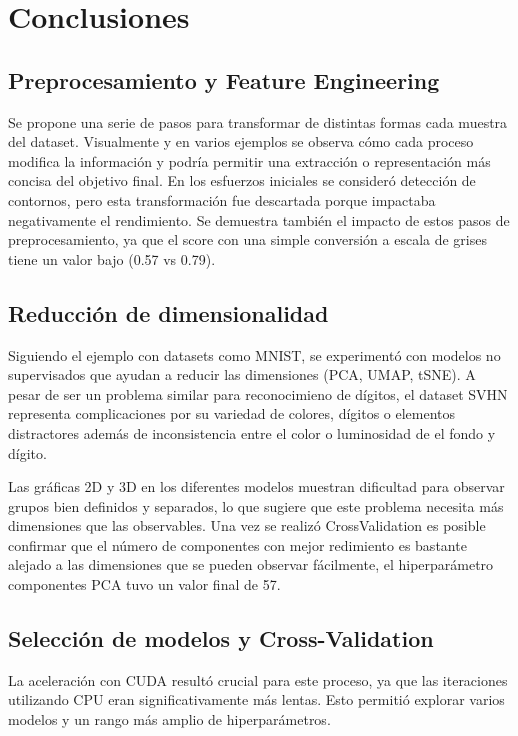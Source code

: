 \documentclass[journal]{IEEEtran}
\begin{document}
\section{Conclusiones}

\subsection{Preprocesamiento y Feature Engineering}
Se propone una serie de pasos para transformar de distintas formas cada muestra del dataset. Visualmente y en varios ejemplos se observa cómo cada proceso modifica la información y podría permitir una extracción o representación más concisa del objetivo final. En los esfuerzos iniciales se consideró detección de contornos, pero esta transformación fue descartada porque impactaba negativamente el rendimiento. Se demuestra también el impacto de estos pasos de preprocesamiento, ya que el score con una simple conversión a escala de grises tiene un valor bajo (0.57 vs 0.79).

\subsection{Reducción de dimensionalidad}
Siguiendo el ejemplo con datasets como MNIST, se experimentó con modelos no supervisados que ayudan a reducir las dimensiones (PCA, UMAP, tSNE). A pesar de ser un problema similar para reconocimieno de dígitos, el dataset SVHN representa complicaciones por su variedad de colores, dígitos o elementos distractores además de inconsistencia entre el color o luminosidad de el fondo y dígito.

Las gráficas 2D y 3D en los diferentes modelos muestran dificultad para observar grupos bien definidos y separados, lo que sugiere que este problema necesita más dimensiones que las observables. Una vez se realizó CrossValidation es posible confirmar que el número de componentes con mejor redimiento es bastante alejado a las dimensiones que se pueden observar fácilmente, el hiperparámetro componentes PCA tuvo un valor final de 57.

\subsection{Selección de modelos y Cross-Validation}
La aceleración con CUDA resultó crucial para este proceso, ya que las iteraciones utilizando CPU eran significativamente más lentas. Esto permitió explorar varios modelos y un rango más amplio de hiperparámetros.
\end{document}
